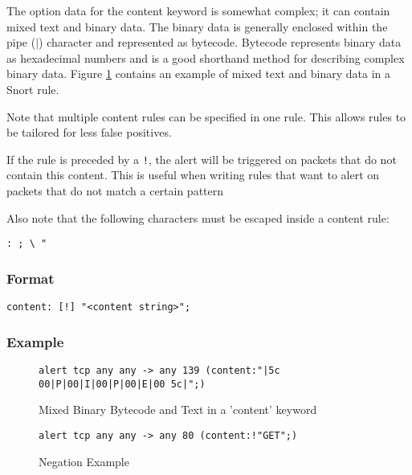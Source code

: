 \documentclass[english]{report}
\newenvironment{note}{
\samepage
    \vspace{10pt}{\textsf{
        {\hspace{7pt}\Huge{$\triangle$\hspace{-12.5pt}{\Large{$^!$}}}}\hspace{5pt}
        {\Large{NOTE}}
    }
    }
   \begin{center}
    \par\vspace{-17pt}

    \begin{lrbox}{\savepar}
    \begin{minipage}[r]{6in}
}
{
    \end{minipage}
    \end{lrbox}
    \fbox{
        \usebox{
            \savepar
	}
    }
    \par\vskip10pt
    \end{center}
}
\newenvironment{note}{
        \begin{rawhtml}
        <p><table border="1"><tr><td><b>
        Note:&nbsp;&nbsp;</b>
        \end{rawhtml}
}{
        \begin{rawhtml}
        </b></td></tr></table></p>
        \end{rawhtml}
}
\begin{document}
The option data for the content keyword is somewhat complex; it can
contain mixed text and binary data. The binary data is generally enclosed
within the pipe ($|$) character and represented
as bytecode. Bytecode represents binary data as hexadecimal numbers
and is a good shorthand method for describing complex binary data.
Figure \ref{mixed content example} contains an example of mixed text
and binary data in a Snort rule. 

Note that multiple content rules can be specified in one rule. This
allows rules to be tailored for less false positives. 

If the rule is preceded by a \texttt{!}, the alert will be triggered
on packets that do not contain this content. This is useful when writing
rules that want to alert on packets that do not match a certain pattern

\begin{note}
Also note that the following characters must be escaped inside a content
rule:

\begin{verbatim}
: ; \ "
\end{verbatim}
\end{note}


\subsubsection{Format}

\begin{verbatim}
content: [!] "<content string>";
\end{verbatim}


\subsubsection{Example}

\begin{figure}[!hbpt]
\begin{verbatim}
alert tcp any any -> any 139 (content:"|5c 00|P|00|I|00|P|00|E|00 5c|";)
\end{verbatim}
\caption{\label{mixed content example}Mixed Binary Bytecode and Text in a 'content' keyword}
\end{figure}

\begin{figure}[!hbpt]
\begin{verbatim}
alert tcp any any -> any 80 (content:!"GET";)
\end{verbatim}
\caption{\label{content negation example}Negation Example}
\end{figure}
\end{document}
